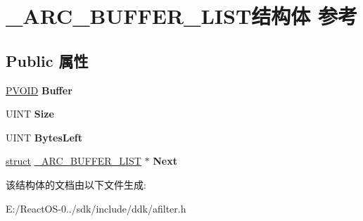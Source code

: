 \hypertarget{struct___a_r_c___b_u_f_f_e_r___l_i_s_t}{}\section{\+\_\+\+A\+R\+C\+\_\+\+B\+U\+F\+F\+E\+R\+\_\+\+L\+I\+S\+T结构体 参考}
\label{struct___a_r_c___b_u_f_f_e_r___l_i_s_t}
\subsection*{Public 属性}
\begin{DoxyCompactItemize}
\item 
\mbox{\label{struct___a_r_c___b_u_f_f_e_r___l_i_s_t_a2987f2543aeb9b08b558f7f7d519c9ac}} 
\hyperlink{interfacevoid}{P\+V\+O\+ID} {\bfseries Buffer}
\item 
\mbox{\label{struct___a_r_c___b_u_f_f_e_r___l_i_s_t_a3a10db1e13c8e1d44bee7e96abad156c}} 
U\+I\+NT {\bfseries Size}
\item 
\mbox{\label{struct___a_r_c___b_u_f_f_e_r___l_i_s_t_a59a16664d3134f7a475da1e40696017a}} 
U\+I\+NT {\bfseries Bytes\+Left}
\item 
\mbox{\label{struct___a_r_c___b_u_f_f_e_r___l_i_s_t_a139c658054862979bc8b04548de425b5}} 
\hyperlink{interfacestruct}{struct} \hyperlink{struct___a_r_c___b_u_f_f_e_r___l_i_s_t}{\+\_\+\+A\+R\+C\+\_\+\+B\+U\+F\+F\+E\+R\+\_\+\+L\+I\+ST} $\ast$ {\bfseries Next}
\end{DoxyCompactItemize}


该结构体的文档由以下文件生成\+:\begin{DoxyCompactItemize}
\item 
E\+:/\+React\+O\+S-\/0../sdk/include/ddk/afilter.\+h\end{DoxyCompactItemize}
